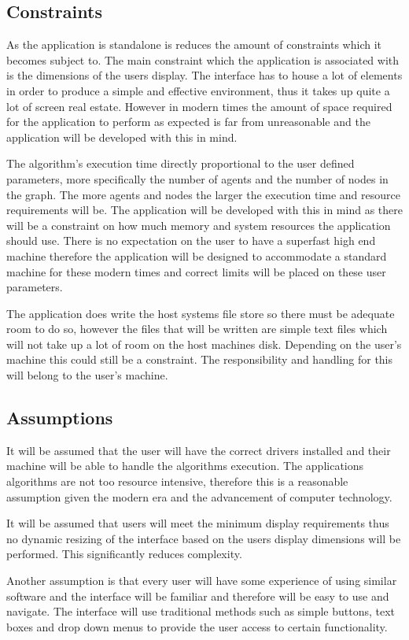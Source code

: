 \documentclass[10pt,a4paper]{article}
\begin{document}
\subsection{Constraints}

As the application is standalone is reduces the amount of constraints which it becomes subject to. The main constraint which the application is associated with is the dimensions of the users display. The interface has to house a lot of elements in order to produce a simple and effective environment, thus it takes up quite a lot of screen real estate. However in modern times the amount of space required for the application to perform as expected is far from unreasonable and the application will be developed with this in mind.

The algorithm’s execution time directly proportional to the user defined parameters, more specifically the number of agents and the number of nodes in the graph. The more agents and nodes the larger the execution time and resource requirements will be. The application will be developed with this in mind as there will be a constraint on how much memory and system resources the application should use. There is no expectation on the user to have a superfast high end machine therefore the application will be designed to accommodate a standard machine for these modern times and correct limits will be placed on these user parameters.

The application does write the host systems file store so there must be adequate room to do so, however the files that will be written are simple text files which will not take up a lot of room on the host machines disk. Depending on the user’s machine this could still be a constraint. The responsibility and handling for this will belong to the user’s machine.

\subsection{Assumptions}

It will be assumed that the user will have the correct drivers installed and their machine will be able to handle the algorithms execution. The applications algorithms are not too resource intensive, therefore this is a reasonable assumption given the modern era and the advancement of computer technology.

It will be assumed that users will meet the minimum display requirements thus no dynamic resizing of the interface based on the users display dimensions will be performed. This significantly reduces complexity.

Another assumption is that every user will have some experience of using similar software and the interface will be familiar and therefore will be easy to use and navigate. The interface will use traditional methods such as simple buttons, text boxes and drop down menus to provide the user access to certain functionality.
\end{document}

